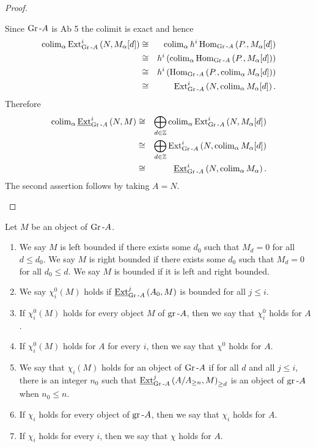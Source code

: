 \documentclass[dissertation.tex]{subfiles}
\begin{document}
\begin{prop}
\begin{proof}
\begin{enumerate}
      Since $\operatorname{Gr}\text{-}A$ is Ab 5 the colimit is exact and hence
      \begin{eqnarray*}
        \operatorname{colim}_\alpha \operatorname{Ext}^{i}_{\operatorname{Gr}\text{-}A}\left(N, M_\alpha[d]\right)
        &\cong& \operatorname{colim}_\alpha h^i\operatorname{Hom}_{\operatorname{Gr}\text{-}A}\left(P_\cdot, M_\alpha[d]\right)\\
        &\cong& h^i\left(\operatorname{colim}_\alpha \operatorname{Hom}_{\operatorname{Gr}\text{-}A}\left(P_\cdot, M_\alpha[d]\right) \right)\\
        &\cong& h^i\left(\operatorname{Hom}_{\operatorname{Gr}\text{-}A}\left(P_\cdot, \operatorname{colim}_\alpha M_\alpha[d]\right)\right)\\
        &\cong& \operatorname{Ext}^{i}_{\operatorname{Gr}\text{-}A}\left(N, \operatorname{colim}_\alpha M_\alpha[d]\right).
      \end{eqnarray*}
      Therefore 
      \begin{eqnarray*}
        \operatorname{colim}_\alpha \operatorname{\underline{Ext}}^{i}_{\operatorname{Gr}\text{-}A}\left(N,M\right) 
        &\cong& \bigoplus_{d \in \mathbb{Z}}\operatorname{colim}_\alpha \operatorname{Ext}^{i}_{\operatorname{Gr}\text{-}A}\left(N, M_\alpha[d]\right)\\
        &\cong& \bigoplus_{d \in \mathbb{Z}}\operatorname{Ext}^{i}_{\operatorname{Gr}\text{-}A}\left(N, \operatorname{colim}_\alpha M_\alpha[d]\right)\\
        &\cong& \operatorname{\underline{Ext}}^{i}_{\operatorname{Gr}\text{-}A}\left(N, \operatorname{colim}_\alpha M_\alpha\right).
      \end{eqnarray*}
      The second assertion follows by taking $A = N$.
    \end{enumerate}
  \end{proof}

  \begin{defn}
    Let $M$ be an object of $\operatorname{Gr}\text{-}A$.
    \begin{enumerate}
    \item
      We say $M$ is left bounded if there exists some $d_0$ such that $M_d = 0$ for all $d \leq d_0$.
      We say $M$ is right bounded if there exists some $d_0$ such that $M_d = 0$ for all $d_0 \leq d$.
      We say $M$ is bounded if it is left and right bounded.
    \item
      We say $\chi_i^0(M)$ holds if $\operatorname{\underline{Ext}}^{j}_{\operatorname{Gr}\text{-}A}\left(A_0, M\right)$ is bounded for all $j \leq i$.
    \item
      If $\chi^0_i(M)$ holds for every object $M$ of $\operatorname{gr}\text{-}A$, then we say that $\chi^0_i$ holds for $A$.
    \item
      If $\chi^0_i(M)$ holds for $A$ for every $i$, then we say that $\chi^0$ holds for $A$.
    \item
      We say that $\chi_i(M)$ holds for an object of $\operatorname{Gr}\text{-}A$ if for all $d$ and all $j \leq i$, there is an integer $n_0$ such that $\operatorname{\underline{Ext}}^{j}_{\operatorname{Gr}\text{-}A}\left(A/A_{\geq n}, M\right)_{\geq d}$ is an object of $\operatorname{gr}\text{-}A$ when $n_0 \leq n$.
    \item
      If $\chi_i$ holds for every object of $\operatorname{gr}\text{-}A$, then we say that $\chi_i$ holds for $A$.
    \item
      If $\chi_i$ holds for every $i$, then we say that $\chi$ holds for $A$.
    \end{enumerate}
  \end{defn}


\end{prop}
\end{document}
